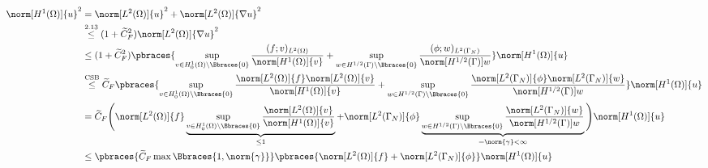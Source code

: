 \begin{solution}
\begin{enumerate}[label = (\roman*)]
    \begin{align*}
        \norm[H^1(\Omega)]{u}^2
        & =
        \norm[L^2(\Omega)]{u}^2
        +
        \norm[L^2(\Omega)]{\nabla u}^2 \\
        & \stackrel
        {
            \text{2.13}
        }{\leq}
        (1 + \widetilde{C}_F^2)
        \norm[L^2(\Omega)]{\nabla u}^2 \\
        & \leq
        (1 + \widetilde{C}_F^2)
        \pbraces
        {
            \sup_{v \in H_0^1(\Omega) \setminus \Bbraces{0}}
            \frac
            {
                (f; v)_{L^2(\Omega)}
            }{
                \norm[H^1(\Omega)]{v}
            }
            +
            \sup_{w \in H^{1/2}(\Gamma) \setminus \Bbraces{0}}
            \frac
            {
                (\phi; w)_{L^2(\Gamma_N)}
            }{
                \norm[H^{1/2}(\Gamma)]{w}
            }
        } \norm[H^1(\Omega)]{u} \\
        & \stackrel{\text{CSB}}{\leq}
        \widetilde{C}_F
        \pbraces
        {
            \sup_{v \in H_0^1(\Omega) \setminus \Bbraces{0}}
            \frac
            {
                \norm[L^2(\Omega)]{f}
                \norm[L^2(\Omega)]{v}
            }{
                \norm[H^1(\Omega)]{v}
            }
            +
            \sup_{w \in H^{1/2}(\Gamma) \setminus \Bbraces{0}}
            \frac
            {
                \norm[L^2(\Gamma_N)]{\phi}
                \norm[L^2(\Gamma_N)]{w}
            }{
                \norm[H^{1/2}(\Gamma)]{w}
            }
        } \norm[H^1(\Omega)]{u}\\
        & =
        \widetilde{C}_F
        \Bigg (
            \norm[L^2(\Omega)]{f}
            \underbrace
            {
                \sup_{v \in H_0^1(\Omega) \setminus \Bbraces{0}}
                \frac
                {
                    \norm[L^2(\Omega)]{v}
                }{
                    \norm[H^1(\Omega)]{v}
                }
            }_{
                \leq 1
            }
            +
            \norm[L^2(\Gamma_N)]{\phi}
            \underbrace
            {
                \sup_{w \in H^{1/2}(\Gamma) \setminus \Bbraces{0}}
                \frac
                {
                    \norm[L^2(\Gamma_N)]{w}
                }{
                    \norm[H^{1/2}(\Gamma)]{w}
                }
            }_{
                =
                \norm{\gamma}
                <
                \infty
            }
        \Bigg ) \norm[H^1(\Omega)]{u}\\
        & \leq
        \pbraces
        {
            \widetilde{C}_F
            \max \Bbraces{1, \norm{\gamma}}
        }
        \pbraces
        {
            \norm[L^2(\Omega)]{f}
            +
            \norm[L^2(\Gamma_N)]{\phi}
        }\norm[H^1(\Omega)]{u}
    \end{align*}


\end{enumerate}
\end{solution}
